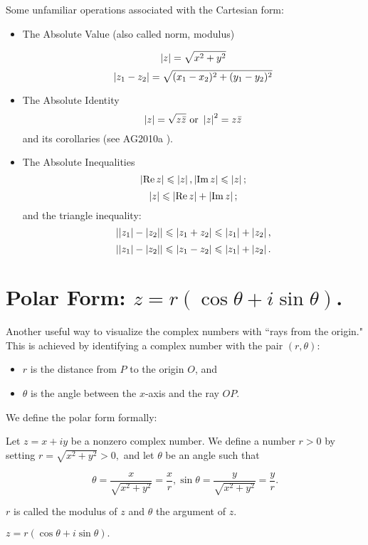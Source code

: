 \documentclass[11pt,reqno,oneside,a4paper]{article}
\begin{document}
Some unfamiliar operations associated with the Cartesian form: 
\begin{itemize}
	\item The Absolute Value (also called norm, modulus)
	
	$$\left\lvert z\right\rvert = \sqrt{x^2 + y^2}$$
	$$\left\lvert z_1 - z_2\right\rvert = \sqrt{(x_1-x_2)^2 + (y_1 - y_2)^2}$$
	
	\item The Absolute Identity
	$$\left\lvert z\right\rvert = \sqrt{z \bar{z}} \text{ or } \left\lvert z\right\rvert^2 = z \bar{z}$$
	and its corollaries (see AG2010a \cite{AG2010a}). 
	
	\item The Absolute Inequalities
	$$\left\lvert\operatorname*{Re} z\right\rvert \leqslant \left\lvert z\right\rvert, \left\lvert\operatorname*{Im} z\right\rvert \leqslant \left\lvert z\right\rvert;$$
	$$\left\lvert z\right\rvert \leqslant \left\lvert\operatorname*{Re} z\right\rvert + \left\lvert\operatorname*{Im} z\right\rvert;$$
	and the triangle inequality: 
	$$\left\lvert\left\lvert z_1\right\rvert-\left\lvert z_2\right\rvert\right\rvert \leqslant \left\lvert z_1 + z_2\right\rvert \leqslant \left\lvert z_1\right\rvert + \left\lvert z_2\right\rvert,$$
	$$\left\lvert\left\lvert z_1\right\rvert-\left\lvert z_2\right\rvert\right\rvert \leqslant \left\lvert z_1 - z_2\right\rvert \leqslant \left\lvert z_1\right\rvert + \left\lvert z_2\right\rvert.$$ 
\end{itemize}

\section{Polar Form: $z = r(\cos\theta + i\sin\theta)$.}
Another useful way to visualize the complex numbers with ``rays from the origin." This is achieved by identifying a complex number with the pair $(r,\theta):$ 
\begin{itemize}
	\item $r$ is the distance from $P$ to the origin $O$, and 
	\item $\theta$ is the angle between the $x$-axis and the ray $OP$. 
\end{itemize}

We define the polar form formally: 

\begin{defn}
	Let $z=x+iy$ be a nonzero complex number. We define a number $r>0$ by setting $r = \sqrt{x^2 + y^2}>0,$ and let $\theta$ be an angle such that 
	
	$$\theta = \frac{x}{\sqrt{x^2 + y^2}} = \frac{x}{r}, \sin \theta = \frac{y}{\sqrt{x^2 + y^2}} = \frac{y}{r}.$$
	
	$r$ is called the modulus of $z$  and $\theta$ the argument of $z$. 
	
	$z = r(\cos\theta + i\sin\theta).$
\end{defn}
\end{document}

